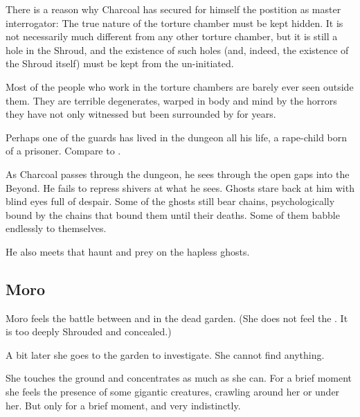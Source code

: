 There is a reason why Charcoal has secured for himself the postition as master interrogator: 
The true nature of the torture chamber must be kept hidden. 
It is not necessarily much different from any other torture chamber, but it is still a hole in the Shroud, and the existence of such holes (and, indeed, the existence of the Shroud itself) must be kept from the un-initiated. 

Most of the people who work in the torture chambers are barely ever seen outside them. They are terrible degenerates, warped in body and mind by the horrors they have not only witnessed but been surrounded by for years. 

Perhaps one of the guards has lived in the dungeon all his life, a rape-child born of a prisoner. 
Compare to \cite{VictorHugo:HunchbackofNotreDame}.

As Charcoal passes through the dungeon, he sees through the open gaps into the Beyond. He fails to repress shivers at what he sees. Ghosts stare back at him with blind eyes full of despair. Some of the ghosts still bear chains, psychologically bound by the chains that bound them until their deaths. 
Some of them babble endlessly to themselves. 

He also meets \daemons{} that haunt and prey on the hapless ghosts. 









\subsection{Moro \Cobrel}
Moro \Cobrel{} feels the battle between \Ishnaruchaefir{} and \Teshrial{} in the dead garden. 
(She does not feel the \noggyal. It is too deeply Shrouded and concealed.) 

A bit later she goes to the garden to investigate. 
She cannot find anything.

She touches the ground and concentrates as much as she can. 
For a brief moment she feels the presence of some gigantic creatures, crawling around her or under her. 
But only for a brief moment, and very indistinctly. 










